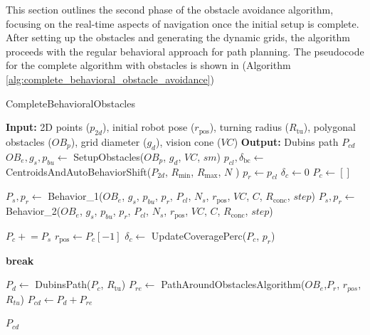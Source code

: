 This section outlines the second phase of the obstacle avoidance algorithm, focusing on the real-time aspects of navigation once the initial setup is complete. After setting up the obstacles and generating the dynamic grids, the algorithm proceeds with the regular behavioral approach for path planning. The pseudocode for the complete algorithm with obstacles is shown in (Algorithm \autoref{alg:complete_behavioral_obstacle_avoidance})





\begin{algorithm}[H]
    \caption{CompleteBehavioralObstacles}
    \label{alg:complete_behavioral_obstacle_avoidance}
    \begin{algorithmic}[1]
    \Statex \textbf{Input:} 2D points ($p_{2d}$), initial robot pose ($r_{\text{pos}}$), turning radius ($R_{\text{tu}}$), polygonal obstacles ($OB_p$), grid diameter ($g_d$), vision cone ($VC$) 
    \Statex \textbf{Output:} Dubins path $P_{cd}$
    \newline
    \State $OB_e, g_s, p_{bu} \leftarrow$ SetupObstacles($OB_p$, $g_d$, $VC$, $sm$)
    \State $p_{cl}, \delta_{\text{bc}} \leftarrow$ CentroidsAndAutoBehaviorShift($P_{2d}$, $R_{\text{min}}$, $R_{\text{max}}$, $N$ )
    \State $p_r \leftarrow p_{cl}$
    \State $\delta_c \leftarrow 0$
    \State $P_c \leftarrow []$
    
            \State $P_s, p_r \leftarrow$ Behavior\_1($OB_e$, $g_s$, $p_{bu}$, $p_r$, $P_{cl}$, $N_s$, $r_{\text{pos}}$, $VC$, $C$, $R_{\text{conc}}$, $step$)
        \Else
            \State $P_s, p_r \leftarrow$ Behavior\_2($OB_e$, $g_s$, $p_{bu}$, $p_r$, $P_{cl}$, $N_s$, $r_{\text{pos}}$, $VC$, $C$, $R_{\text{conc}}$, $step$)
        \EndIf
        
        \State $P_c \mathrel{+}= P_s$
        \State $r_{\text{pos}} \leftarrow P_c[-1]$
        \State $\delta_c \leftarrow$ UpdateCoveragePerc($P_c$, $p_r$)
        
            \State \textbf{break}
        \EndIf
    \EndWhile
    
    \State $P_d \leftarrow$ DubinsPath($P_c$, $R_{\text{tu}}$)
    \State $P_{re} \leftarrow$ PathAroundObstaclesAlgorithm($OB_e$,$P_r$, $r_{pos}$, $R_{tu}$)
    \State $P_{cd} \leftarrow P_d + P_{re}$

    \State \Return $P_{cd}$
    \end{algorithmic}
\end{algorithm}


